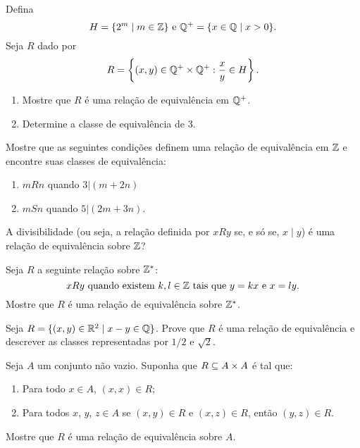 \documentclass[12pt]{exam}
\begin{document}
    \vspace{.3cm}

    \questao{} Defina
    \[
        H = \{2^m \mid m \in \mathbb{Z}\} \mbox{ e } \mathbb{Q}^+ = \{x \in \mathbb{Q} \mid x > 0\}.
    \]
    Seja $R$ dado por
    \[
        R = \left\{(x,y) \in \mathbb{Q}^+\times \mathbb{Q}^+ : \frac{x}{y} \in H\right\}.
    \]
    \begin{enumerate}[label={\alph*})]
        \item Mostre que $R$ \'e uma rela\c{c}\~ao de equival\^encia em $\mathbb{Q}^+$.

        \item Determine a classe de equival\^encia de $3$.
    \end{enumerate}

    \vspace{.3cm}

    \questao{} Mostre que as seguintes condições definem uma relação de equivalência em $\mathbb{Z}$ e encontre suas classes de equivalência:
    \begin{enumerate}[label={\alph*})]
        \item $mRn$ quando $3 | (m + 2n)$

        \item $mSn$ quando $5 | (2m + 3n)$.
    \end{enumerate}

    \vspace{.3cm}

    \questao{} A divisibilidade (ou seja, a rela{\c c}{\~a}o definida por $xRy$ se, e s{\'o}
    se, $x \mid y$) {\'e} uma rela{\c c}{\~a}o de equival{\^e}ncia sobre $\mathbb{Z}$?

    \vspace{.3cm}

    \questao{} Seja $R$ a seguinte rela{\c c}{\~a}o sobre $\mathbb{Z}^*$:
    \[
        x R y \mbox{ quando existem }  k, l \in \mathbb{Z} \mbox{ tais que } y = kx \mbox{ e } x = ly.
    \]
    Mostre que $R$ {\'e} uma rela{\c c}{\~a}o de equival{\^e}ncia sobre $\mathbb{Z}^*$.

    \vspace{.3cm}

    \questao{} Seja $R = \{ (x, y) \in \mathbb{R}^2 \mid x - y \in \mathbb{Q}\}$. Prove que $R$ {\'e} uma rela{\c c}{\~a}o de equival{\^e}ncia e descrever as classes representadas por $1/2$ e $\sqrt{2}$.

    \vspace{.3cm}

    \questao{} Seja $A$ um conjunto n\~ao vazio. Suponha que $R \subseteq A \times A$ \'e tal que:
    \begin{enumerate}[label={\alph*})]
        \item Para todo $x \in A$, $(x,x) \in R$;

        \item Para todos $x$, $y$, $z \in A$ se $(x, y) \in R$ e $(x,z) \in R$, ent\~ao $(y,z) \in R$.
    \end{enumerate}
    Mostre que $R$ \'e uma rela\c{c}\~ao de equival\^encia sobre $A$.
\end{document}
